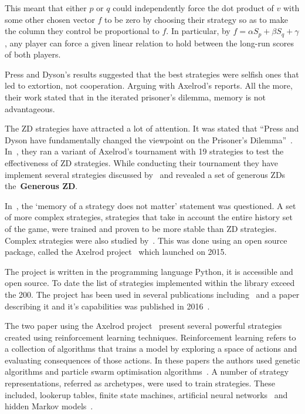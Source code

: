 \documentclass{article}
\theoremstyle{definition}
\begin{document}
This meant that either \(p\) or \(q\) could independently force the dot product
of \(v\) with some other chosen vector \(f\) to be zero by choosing their
strategy so as to make the column they control be proportional to \(f\).
In particular, by \( f = \alpha S_p + \beta S_q + \gamma\), any player can force
a given linear relation to hold between the long-run scores of both players.

Press and Dyson's results suggested that the best strategies were selfish ones
that led to extortion, not cooperation. Arguing with Axelrod's reports.
All the more, their work stated that in the iterated prisoner's dilemma, memory
is not advantageous.

The ZD strategies have attracted a lot of attention. It was stated that
``Press and Dyson have fundamentally changed the viewpoint on the Prisoner's
Dilemma''~\cite{Stewart2012}. In~\cite{Stewart2012}, they ran a variant of
Axelrod's tournament with 19 strategies to test the effectiveness of 
ZD strategies. While conducting their tournament they have implement several
strategies discussed by~\cite{Press2012} and revealed a set of generous ZDs
the~\textbf{Generous ZD}.

In~\cite{Lee2015}, the `memory of a strategy does not matter' statement was
questioned. A set of more complex strategies, strategies that take in account
the entire history set of the game, were trained and proven to be more stable than
ZD strategies. Complex strategies were also studied by~\cite{Knight2017,KnightHGC17}.
This was done using an open source package, called the Axelrod project~\cite{axelrodproject}
which launched on 2015.

The project is written in the programming language
Python, it is accessible and open source. To date the list of strategies implemented
within the library exceed the 200. The project has been used in several
publications including~\cite{Knight2017} and a paper describing it and
it's capabilities was published in 2016~\cite{Knight2016}.

The two paper using the Axelrod project~\cite{Knight2017, KnightHGC17} present
several powerful strategies created using reinforcement learning techniques.
Reinforcement learning refers to a collection of algorithms that trains a model by
exploring a space of actions and evaluating consequences of those actions. In these
papers the authors used genetic algorithms and particle swarm optimisation
algorithms~\cite{suganthan1999}. A number of strategy representations, referred as
archetypes, were used to train strategies. These included, lookerup tables,
finite state machines, artificial neural networks~\cite{yegnanarayana2009} and
hidden Markov models~\cite{eddy1996}.
\end{document}
